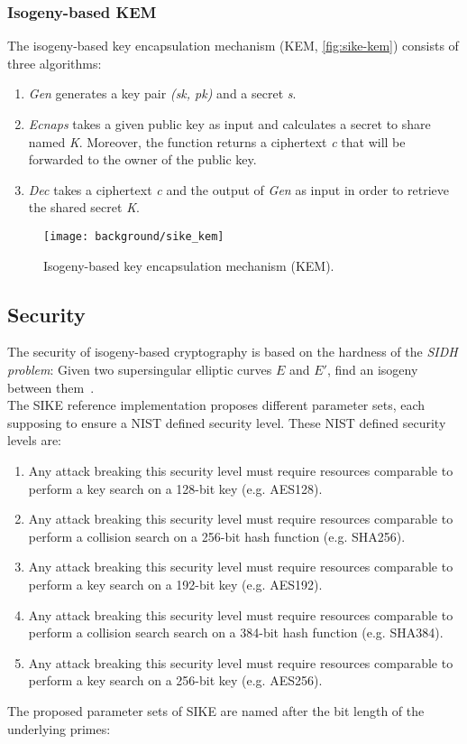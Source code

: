 \subsubsection{Isogeny-based KEM}
The isogeny-based key encapsulation mechanism (KEM, \autoref{fig:sike-kem}) consists of three algorithms:
\begin{enumerate}
\item \textit{Gen} generates a key pair \textit{(sk, pk)} and a secret \textit{s}.
\item \textit{Ecnaps} takes a given public key as input and calculates a secret to share named \textit{K}. Moreover, the function returns a ciphertext \textit{c} that will be forwarded to the owner of the public key.
\item \textit{Dec} takes a ciphertext \textit{c} and the output of \textit{Gen} as input in order to retrieve the shared secret \textit{K}.
\end{enumerate}
\begin{figure}[H]
  \centering
  \texttt{[image: background/sike\_kem]}
  \caption[Isogeny-based KEM]
  {Isogeny-based key encapsulation mechanism (KEM).} \label{fig:sike-kem}
\end{figure}

\subsection{Security}\label{sidh_security}
The security of isogeny-based cryptography is based on the hardness of the \textit{\gls{SIDH} problem}: Given two supersingular elliptic curves $E$ and $E'$, find an isogeny between them~\parencite{sike2020spec}. 
\\
The SIKE reference implementation proposes different parameter sets, each supposing to ensure a NIST defined security level. These NIST defined security levels are:
\begin{enumerate}
\itemsep0em 
	\item Any attack breaking this security level must require resources comparable to perform a key search on a 128-bit key (e.g. AES128).
	\item Any attack breaking this security level must require resources comparable to perform a collision search on a 256-bit hash function (e.g. SHA256).
	\item Any attack breaking this security level must require resources comparable to perform a key search on a 192-bit key (e.g. AES192).
	\item Any attack breaking this security level must require resources comparable to perform a collision search search on a 384-bit hash function (e.g. SHA384).
	\item Any attack breaking this security level must require resources comparable to perform a key search on a 256-bit key (e.g. AES256).
\end{enumerate}
The proposed parameter sets of SIKE are named after the bit length of the underlying primes:

